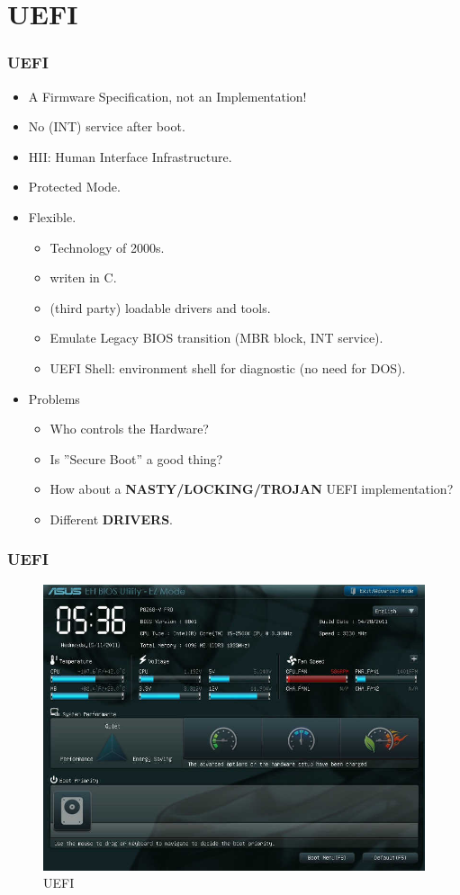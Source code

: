 \documentclass[aspectratio=169, xcolor=table, notheorems, hyperref={pdfpagelabels=false}]{beamer}
\begin{document}
\section{UEFI}
\begin{frame}
\frametitle{UEFI}
\begin{itemize}
\item A Firmware Specification, not an Implementation!
\item No (INT) service after boot.
\item HII: Human Interface Infrastructure.
\item Protected Mode.
\item Flexible.
\begin{itemize}
\item Technology of 2000s.
\item writen in C.
\item (third party) loadable drivers and tools.
\item Emulate Legacy BIOS transition (MBR block, INT service).
\item UEFI Shell: environment shell for diagnostic (no need for DOS).
\end{itemize}
\item Problems
\begin{itemize}
\item Who controls the Hardware?
\item Is ''Secure Boot'' a good thing?
\item How about a \textbf{NASTY/LOCKING/TROJAN} UEFI implementation?
\item Different \textbf{DRIVERS}.
\end{itemize}
\end{itemize}
\end{frame}


\begin{frame}
\frametitle{UEFI}
\begin{figure}
\includegraphics[width=0.59\linewidth]{os03-UEFI.jpg}
\caption{UEFI}
\end{figure}
\end{frame}
\end{document}
